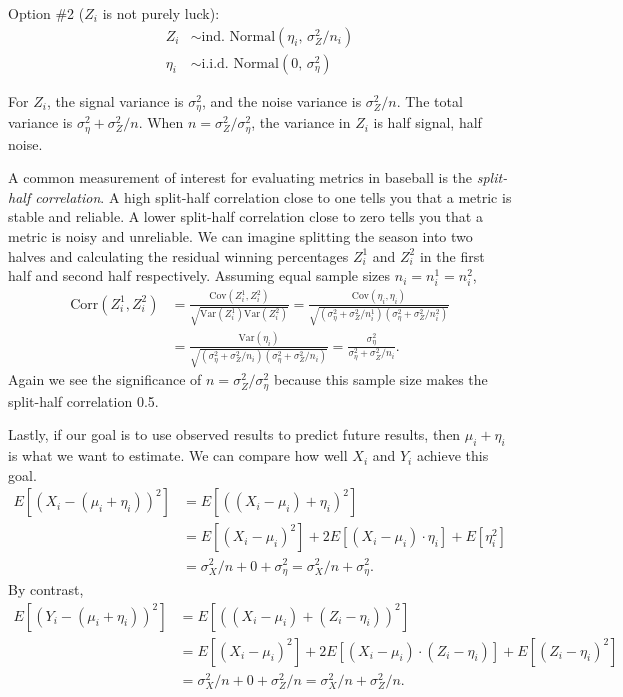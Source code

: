 \documentclass{article}
\begin{document}
      Option \#2 ($Z_i$ is not purely luck):
      \begin{align*}
        Z_i &\sim \mbox{ind. Normal}(\eta_i,\, \sigma^2_Z / n_i)\\
        \eta_i &\sim \mbox{i.i.d. Normal}(0,\, \sigma^2_\eta)
      \end{align*}
    
      For $Z_i$, the signal variance is $\sigma^2_\eta$, and the noise variance is $\sigma^2_Z / n$. The total variance is $\sigma^2_\eta + \sigma^2_Z / n$. When $n = \sigma^2_Z / \sigma^2_\eta$, the variance in $Z_i$ is half signal, half noise.

      A common measurement of interest for evaluating metrics in baseball is the {\it split-half correlation}. A high split-half correlation close to one tells you that a metric is stable and reliable. A lower split-half correlation close to zero tells you that a metric is noisy and unreliable. We can imagine splitting the season into two halves and calculating the residual winning percentages $Z_i^1$ and $Z_i^2$ in the first half and second half respectively. Assuming equal sample sizes $n_i = n_i^1 = n_i^2$,
      \begin{align*}
        \mbox{Corr}(Z_i^1, Z_i^2) &= 
        \frac{\mbox{Cov}(Z_i^1, Z_i^2)}{\sqrt{\mbox{Var}(Z_i^1) \mbox{Var}(Z_i^2)}}
        = \frac{\mbox{Cov}(\eta_i, \eta_i)}{\sqrt{(\sigma^2_\eta + \sigma^2_Z / n^1_i)(\sigma^2_\eta + \sigma^2_Z / n^2_i)}}\\
        & = \frac{\mbox{Var}(\eta_i)}{\sqrt{(\sigma^2_\eta + \sigma^2_Z / n_i)(\sigma^2_\eta + \sigma^2_Z / n_i)}}
        = \frac{\sigma^2_\eta}{\sigma^2_\eta + \sigma^2_Z / n_i}.
      \end{align*}
      Again we see the significance of $n = \sigma^2_Z / \sigma^2_\eta$ because this sample size makes the split-half correlation 0.5.

      Lastly, if our goal is to use observed results to predict future results, then $\mu_i + \eta_i$ is what we want to estimate. We can compare how well $X_i$ and $Y_i$ achieve this goal.
      \begin{align*}
        E[(X_i - (\mu_i + \eta_i))^2] &= E[((X_i - \mu_i) + \eta_i)^2]\\
        &= E[(X_i - \mu_i)^2] + 2E[(X_i - \mu_i) \cdot \eta_i] + E[\eta_i^2]\\
        &= \sigma^2_X / n + 0 + \sigma^2_\eta
        = \sigma^2_X / n + \sigma^2_\eta.
      \end{align*}
      By contrast,
      \begin{align*}
        E[(Y_i - (\mu_i + \eta_i))^2] &= E[((X_i - \mu_i) + (Z_i - \eta_i))^2]\\
        &= E[(X_i - \mu_i)^2] + 2E[(X_i - \mu_i) \cdot (Z_i - \eta_i)] + E[(Z_i - \eta_i)^2]\\
        &= \sigma^2_X / n + 0 + \sigma^2_Z / n
        = \sigma^2_X / n + \sigma^2_Z / n.
      \end{align*}
\end{document}
